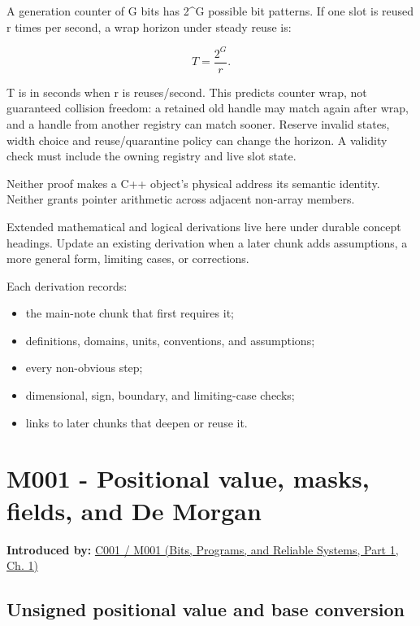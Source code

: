 A generation counter of G bits has 2\^{}G possible bit patterns. If one slot is reused r times per second, a wrap horizon under steady reuse is:

\[
T=\frac{2^G}{r}.
\]

T is in seconds when r is reuses/second. This predicts counter wrap, not guaranteed collision freedom: a retained old handle may match again after wrap, and a handle from another registry can match sooner. Reserve invalid states, width choice and reuse/quarantine policy can change the horizon. A validity check must include the owning registry and live slot state.

Neither proof makes a C++ object's physical address its semantic identity. Neither grants pointer arithmetic across adjacent non-array members.

Extended mathematical and logical derivations live here under durable concept headings. Update an existing derivation when a later chunk adds assumptions, a more general form, limiting cases, or corrections.

Each derivation records:

\begin{itemize}
\tightlist
\item
  the main-note chunk that first requires it;
\item
  definitions, domains, units, conventions, and assumptions;
\item
  every non-obvious step;
\item
  dimensional, sign, boundary, and limiting-case checks;
\item
  links to later chunks that deepen or reuse it.
\end{itemize}

\section{M001 - Positional value, masks, fields, and De Morgan}\label{03-visual-computing-i-ch018-m001---positional-value-masks-fields-and-de-morgan}

\hypertarget{03-visual-computing-i-ch018-m001---positional-value-masks-fields-and-de-morgan}{}

\textbf{Introduced by:} \href{../01-Bits-Programs-and-Reliable-Systems-P01/main.pdf\#01-foundations-i-ch001-from-a-signal-to-an-interpretation}{C001 / M001 (Bits, Programs, and Reliable Systems, Part 1, Ch. 1)}

\subsection{Unsigned positional value and base conversion}\label{03-visual-computing-i-ch018-unsigned-positional-value-and-base-conversion}

